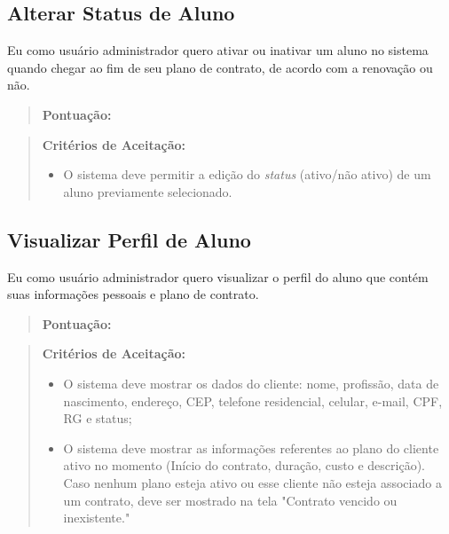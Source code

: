 \subsection[Alterar Status de Aluno]{Alterar Status de Aluno}
Eu como usuário administrador quero ativar ou inativar um aluno no sistema
quando chegar ao fim de seu plano de contrato, de acordo com a renovação ou não.
\begin{quote}
    \textbf{Pontuação:}
\end{quote}
\begin{quote}
\textbf{Critérios de Aceitação:}
    \begin{itemize}
        \item O sistema deve permitir a edição do \textsl{status} (ativo/não ativo) de um aluno
        previamente selecionado.
    \end{itemize}
\end{quote}

\subsection[Visualizar Perfil de Aluno]{Visualizar Perfil de Aluno}
Eu como usuário administrador quero visualizar o perfil do aluno que contém suas
informações pessoais e plano de contrato.
\begin{quote}
    \textbf{Pontuação:}
\end{quote}
\begin{quote}
\textbf{Critérios de Aceitação:}
    \begin{itemize}
        \item O sistema deve mostrar os dados do cliente: nome, profissão, data de nascimento, endereço, CEP, telefone residencial, celular, e-mail, CPF, RG e status;
        \item O sistema deve mostrar as informações referentes ao plano do cliente ativo no momento (Início do contrato, duração,  custo e descrição). Caso nenhum plano esteja ativo ou esse cliente não esteja associado a um contrato, deve ser mostrado na tela "Contrato vencido ou inexistente."
    \end{itemize}
\end{quote}

